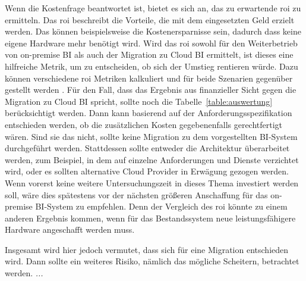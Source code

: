 Wenn die Kostenfrage beantwortet ist, bietet es sich an, das zu erwartende \ac{roi} zu ermitteln. Das \ac{roi} beschreibt die Vorteile, die mit dem eingesetzten Geld erzielt werden. Das können beispielsweise die Kostenersparnisse sein, dadurch dass keine eigene Hardware mehr benötigt wird. Wird das \ac{roi} sowohl für den Weiterbetrieb von on-premise BI als auch der Migration zu Cloud BI ermittelt, ist dieses eine hilfreiche Metrik, um zu entscheiden, ob sich der Umstieg rentieren würde. Dazu können verschiedene \ac{roi} Metriken kalkuliert und für beide Szenarien gegenüber gestellt werden \cite{menon_business_2012}. Für den Fall, dass das Ergebnis aus finanzieller Sicht gegen die Migration zu Cloud BI spricht, sollte noch die Tabelle~\ref{table:auswertung} berücksichtigt werden. Dann kann basierend auf der Anforderungsspezifikation entschieden werden, ob die zusätzlichen Kosten gegebenenfalls gerechtfertigt wären. Sind sie das nicht, sollte keine Migration zu dem vorgestellten BI-System durchgeführt werden. Stattdessen sollte entweder die Architektur überarbeitet werden, zum Beispiel, in dem auf einzelne Anforderungen und Dienste verzichtet wird, oder es sollten alternative Cloud Provider in Erwägung gezogen werden. Wenn vorerst keine weitere Untersuchungszeit in dieses Thema investiert werden soll, wäre dies spätestens vor der nächsten größeren Anschaffung für das on-premise BI-System zu empfehlen. Denn der Vergleich des \ac{roi} könnte zu einem anderen Ergebnis kommen, wenn für das Bestandssystem neue leistungsfähigere Hardware angeschafft werden muss.

Insgesamt wird hier jedoch vermutet, dass sich für eine Migration entschieden wird. Dann sollte ein weiteres Risiko, nämlich das mögliche Scheitern, betrachtet werden. \textit{...}

